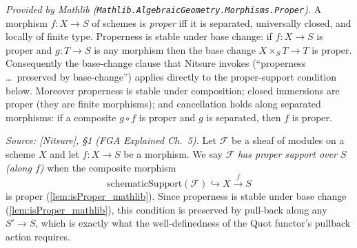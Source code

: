 \begin{lemma}
  \label{lem:isProper_mathlib}
  \mathlibok
  \textit{Provided by Mathlib
  (\texttt{Mathlib.AlgebraicGeometry.Morphisms.Proper}).}
  A morphism \(f : X \to S\) of schemes is \emph{proper} iff it is separated,
  universally closed, and locally of finite type. Properness is stable under base
  change: if \(f : X \to S\) is proper and \(g : T \to S\) is any morphism then
  the base change \(X \times_S T \to T\) is proper. Consequently the base-change
  clause that Nitsure invokes (``properness \ldots\ preserved by base-change'')
  applies directly to the proper-support condition below.  Moreover properness
  is stable under composition; closed immersions are proper (they are finite
  morphisms); and cancellation holds along separated morphisms: if a composite
  \(g \circ f\) is proper and \(g\) is separated, then \(f\) is proper.
\end{lemma}

\begin{definition}

  \label{def:has_proper_support}
  \textit{Source: [Nitsure], \S 1 (FGA Explained Ch.~5).}
  Let \(\mathcal{F}\) be a sheaf of modules on a scheme \(X\) and let
  \(f : X \to S\) be a morphism. We say \(\mathcal{F}\) \emph{has proper support
  over \(S\) (along \(f\))} when the composite morphism
  \[
    \mathrm{schematicSupport}(\mathcal{F}) \hookrightarrow X \xrightarrow{f} S
  \]
  is proper (\cref{lem:isProper_mathlib}). Since properness is stable under base
  change (\cref{lem:isProper_mathlib}), this condition is preserved by pull-back
  along any \(S'\to S\), which is exactly what the well-definedness of the Quot
  functor's pullback action requires.
\end{definition}

